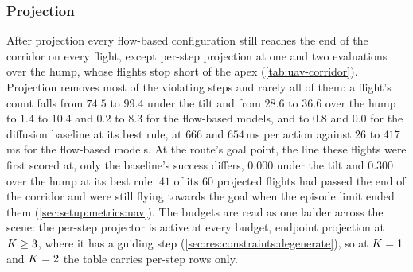 
\FloatBarrier
\subsubsection{Projection}\label{sec:res:uav:projected}
After projection every flow-based configuration still reaches the end of the corridor on every flight,
except per-step projection at one and two evaluations over the hump, whose flights stop short of the apex
(\autoref{tab:uav-corridor}). Projection removes most of the violating steps and rarely all of them: a
flight's count falls from $74.5$ to $99.4$ under the tilt and from $28.6$ to $36.6$ over the hump to $1.4$
to $10.4$ and $0.2$ to $8.3$ for the flow-based models, and to $0.8$ and $0.0$ for the diffusion baseline
at its best rule, at $666$ and $654$\,ms per action against $26$ to $417$\,ms for the flow-based models.
At the route's goal point, the line these flights were first scored at, only the baseline's success
differs, $0.000$ under the tilt and $0.300$ over the hump at its best rule: $41$ of its $60$ projected
flights had passed the end of the corridor and were still flying towards the goal when the episode limit
ended them (\autoref{sec:setup:metrics:uav}). The budgets are read as one ladder across the scene: the
per-step projector is active at every budget, endpoint projection at $K\ge 3$, where it has a guiding
step (\autoref{sec:res:constraints:degenerate}), so at $K=1$ and $K=2$ the table carries per-step
rows only.

